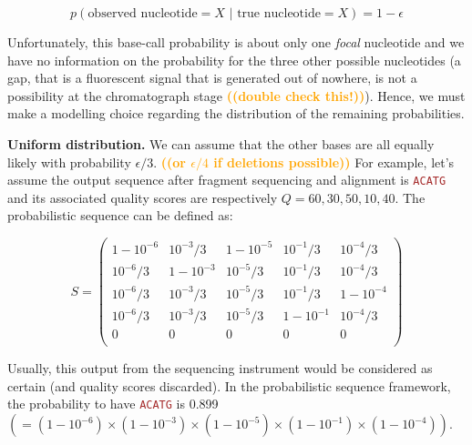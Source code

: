 \documentclass[10pt]{article}
\newcommand{\warning}[1]{\textbf{\textcolor{orange}{((#1))}}}
\newcommand{\sq}[1]{\texttt{\textcolor{brown}{#1}}}
\begin{document}
\begin{equation}
\label{eq:basecall}
p(\text{observed nucleotide}=X \,\,|\,\, \text{true nucleotide} = X) = 1 - \epsilon
\end{equation}

Unfortunately, this base-call probability is about only one \emph{focal} nucleotide and we have no information on the probability for the three other possible nucleotides (a gap, that is a fluorescent signal that is generated out of nowhere, is not a possibility at the chromatograph stage \warning{double check this!}). 
Hence, we must make a modelling choice regarding the distribution of the remaining probabilities. 

\textbf{Uniform distribution.} We can assume that the other bases  are all equally likely with probability $\epsilon/3$. \warning{or $\epsilon/4$ if deletions possible}
For example, let's assume the output sequence after fragment sequencing and alignment is \sq{ACATG} and its associated quality scores are respectively $Q=60,30,50,10,40$. The probabilistic sequence can be defined as:

$$
S = 
\begin{pmatrix}
1-10^{-6} & 10^{-3}/3  & 1-10^{-5} & 10^{-1}/3 & 10^{-4}/3  \\
10^{-6}/3 & 1-10^{-3}  & 10^{-5}/3 & 10^{-1}/3 & 10^{-4}/3  \\
10^{-6}/3 & 10^{-3}/3  & 10^{-5}/3 & 10^{-1}/3 & 1-10^{-4} \\
10^{-6}/3 & 10^{-3}/3  & 10^{-5}/3 & 1-10^{-1} & 10^{-4}/3\\
0&0&0&0&0 \\
\end{pmatrix}
$$

Usually, this output from the sequencing instrument would be considered as certain (and quality scores discarded). In the probabilistic sequence framework, the probability to have \sq{ACATG} is 0.899 ${\displaystyle(=(1-10^{-6})\times (1-10^{-3})\times (1-10^{-5})\times (1-10^{-1})\times (1-10^{-4}))}$.
\end{document}
